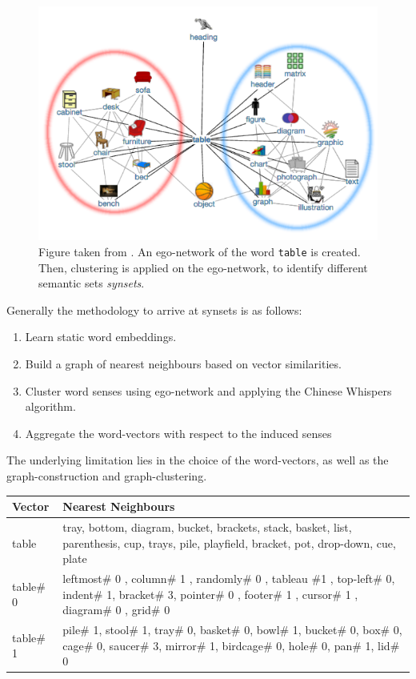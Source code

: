 \documentclass[a4paper,12pt,oneside,openright]{report}
\begin{document}
\begin{figure}[h]
	\center
  \includegraphics[width=0.6\linewidth]{./assets/relatedwork/ego_network.png}
  \caption{Figure taken from \cite{pelevina16}. An ego-network of the word \texttt{table} is created. Then, clustering is applied on the ego-network, to identify different semantic sets \textit{synsets}.}
  \label{fig:ego_network}
\end{figure}

Generally the methodology to arrive at synsets is as follows: 

\begin{enumerate}
\item Learn static word embeddings.
\item Build a graph of nearest neighbours based on vector similarities.
\item Cluster word senses using ego-network and applying the Chinese Whispers algorithm.
\item Aggregate the word-vectors with respect to the induced senses
\end{enumerate}

The underlying limitation lies in the choice of the word-vectors, as well as the graph-construction and graph-clustering. \\

\begin{table}[H]
    \centering
    \begin{tabularx}{\textwidth}{p{50pt}|b}
    \toprule
      {\textbf{Vector}} & {\textbf{Nearest Neighbours}}  \\ \midrule
        table & tray, bottom, diagram, bucket, brackets, stack, basket, list, parenthesis, cup, trays, pile, playfield, bracket, pot, drop-down, cue, plate \\ \hline
        table\# 0 & leftmost\# 0 , column\# 1 , randomly\# 0 , tableau \#1 , top-left\# 0, indent\# 1, bracket\# 3, pointer\# 0 , footer\# 1 , cursor\# 1 , diagram\# 0 , grid\# 0      \\ \hline
        table\# 1 & pile\# 1, stool\# 1, tray\# 0, basket\# 0, bowl\# 1, bucket\# 0, box\# 0, cage\# 0, saucer\# 3, mirror\# 1, birdcage\# 0, hole\# 0, pan\# 1, lid\# 0    \\ \hline
    \end{tabularx}
\end{table}
\end{document}
